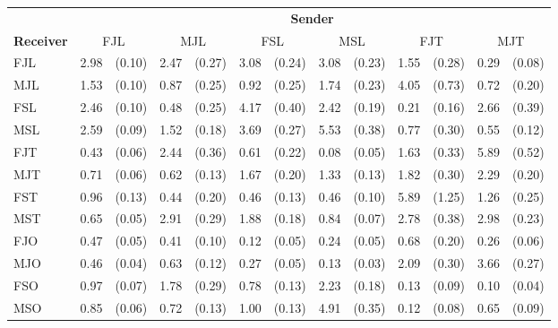 
\begin{tabular}{ll@{\,\,\,}rl@{\,\,\,}rl@{\,\,\,}rl@{\,\,\,}rl@{\,\,\,}rl@{\,\,\,}r}
\toprule
    & \multicolumn{12}{c}{\textbf{Sender}} \\
    \cmidrule(lr){2- 13 }
\textbf{Receiver}
    & \multicolumn{2}{c}{\textnormal{FJL}}
    & \multicolumn{2}{c}{\textnormal{MJL}}
    & \multicolumn{2}{c}{\textnormal{FSL}}
    & \multicolumn{2}{c}{\textnormal{MSL}}
    & \multicolumn{2}{c}{\textnormal{FJT}}
    & \multicolumn{2}{c}{\textnormal{MJT}} \\
    \cmidrule(lr){1-1}
    \cmidrule(lr){2-3}
    \cmidrule(lr){4-5}
    \cmidrule(lr){6-7}
    \cmidrule(lr){8-9}
    \cmidrule(lr){10-11}
    \cmidrule(lr){12-13}
    \textnormal{FJL} & 2.98 & (0.10) & 2.47 & (0.27) & 3.08 & (0.24) & 3.08 & (0.23) & 1.55 & (0.28) & 0.29 & (0.08) \\
    \textnormal{MJL} & 1.53 & (0.10) & 0.87 & (0.25) & 0.92 & (0.25) & 1.74 & (0.23) & 4.05 & (0.73) & 0.72 & (0.20) \\
    \textnormal{FSL} & 2.46 & (0.10) & 0.48 & (0.25) & 4.17 & (0.40) & 2.42 & (0.19) & 0.21 & (0.16) & 2.66 & (0.39) \\
    \textnormal{MSL} & 2.59 & (0.09) & 1.52 & (0.18) & 3.69 & (0.27) & 5.53 & (0.38) & 0.77 & (0.30) & 0.55 & (0.12) \\
    \textnormal{FJT} & 0.43 & (0.06) & 2.44 & (0.36) & 0.61 & (0.22) & 0.08 & (0.05) & 1.63 & (0.33) & 5.89 & (0.52) \\
    \textnormal{MJT} & 0.71 & (0.06) & 0.62 & (0.13) & 1.67 & (0.20) & 1.33 & (0.13) & 1.82 & (0.30) & 2.29 & (0.20) \\
    \textnormal{FST} & 0.96 & (0.13) & 0.44 & (0.20) & 0.46 & (0.13) & 0.46 & (0.10) & 5.89 & (1.25) & 1.26 & (0.25) \\
    \textnormal{MST} & 0.65 & (0.05) & 2.91 & (0.29) & 1.88 & (0.18) & 0.84 & (0.07) & 2.78 & (0.38) & 2.98 & (0.23) \\
    \textnormal{FJO} & 0.47 & (0.05) & 0.41 & (0.10) & 0.12 & (0.05) & 0.24 & (0.05) & 0.68 & (0.20) & 0.26 & (0.06) \\
    \textnormal{MJO} & 0.46 & (0.04) & 0.63 & (0.12) & 0.27 & (0.05) & 0.13 & (0.03) & 2.09 & (0.30) & 3.66 & (0.27) \\
    \textnormal{FSO} & 0.97 & (0.07) & 1.78 & (0.29) & 0.78 & (0.13) & 2.23 & (0.18) & 0.13 & (0.09) & 0.10 & (0.04) \\
    \textnormal{MSO} & 0.85 & (0.06) & 0.72 & (0.13) & 1.00 & (0.13) & 4.91 & (0.35) & 0.12 & (0.08) & 0.65 & (0.09) \\
\end{tabular}

